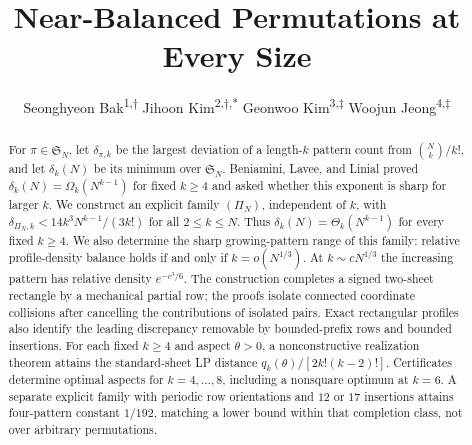 \documentclass[11pt,letterpaper]{article}
\title{Near-Balanced Permutations at Every Size}
\author{%
 Seonghyeon Bak\textsuperscript{1,\ensuremath{\dagger}}\quad
 Jihoon Kim\textsuperscript{2,\ensuremath{\dagger},*}\quad
 Geonwoo Kim\textsuperscript{3,\ensuremath{\ddagger}}\quad
 Woojun Jeong\textsuperscript{4,\ensuremath{\ddagger}}
}
\date{}
\begin{document}
\maketitle
\begingroup
\renewcommand{\thefootnote}{}
\begin{NoHyper}
\end{NoHyper}
\addtocounter{footnote}{-1}
\endgroup

\begin{abstract}
For $\pi\in\mathfrak S_N$, let $\delta_{\pi,k}$ be the largest deviation
of a length-$k$ pattern count from $\binom Nk/k!$, and let $\delta_k(N)$
be its minimum over $\mathfrak S_N$. Beniamini, Lavee, and Linial proved
$\delta_k(N)=\Omega_k(N^{k-1})$ for fixed $k\ge4$ and asked whether this
exponent is sharp for larger $k$. We construct an explicit family
$(\Pi_N)$, independent of $k$, with
$\delta_{\Pi_N,k}<14k^3N^{k-1}/(3k!)$ for all $2\le k\le N$.
Thus $\delta_k(N)=\Theta_k(N^{k-1})$ for every fixed $k\ge4$.
We also determine the sharp growing-pattern range of this family:
relative profile-density balance holds if and only if $k=o(N^{1/3})$.
At $k\sim cN^{1/3}$ the increasing pattern has relative density
$e^{-c^3/6}$. The construction completes a signed two-sheet rectangle
by a mechanical partial row; the proofs isolate connected coordinate
collisions after cancelling the contributions of isolated pairs.
Exact rectangular profiles also identify the leading discrepancy removable
by bounded-prefix rows and bounded insertions. For each fixed $k\ge4$
and aspect $\theta>0$, a nonconstructive realization theorem attains the
standard-sheet LP distance $q_k(\theta)/[2k!(k-2)!]$. Certificates determine
optimal aspects for $k=4,\ldots,8$, including a nonsquare optimum at $k=6$.
A separate explicit family with periodic row orientations and $12$ or $17$
insertions attains four-pattern constant $1/192$, matching a lower bound
within that completion class, not over arbitrary permutations.
\end{abstract}
\end{document}
